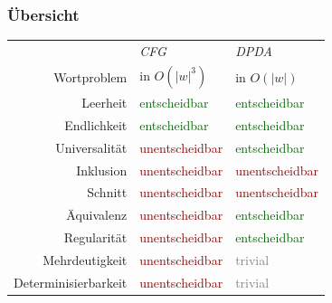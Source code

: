 \documentclass[aspectratio=1610,onlymath]{beamer}
\begin{document}
\begin{frame}\frametitle{Übersicht}

\begin{tabular}{rll}
 & \emph{CFG} & \emph{DPDA}\\
Wortproblem
	& in $O(|w|^3)$
	& in $O(|w|)$\\[1ex]
Leerheit 
	& \textcolor{darkgreen}{entscheidbar}
	& \textcolor{darkgreen}{entscheidbar}\\
Endlichkeit
	& \textcolor{darkgreen}{entscheidbar}
	& \textcolor{darkgreen}{entscheidbar}\\
Universalität
	& \textcolor{darkred}{unentscheidbar}
	& \textcolor{darkgreen}{entscheidbar}\\[1ex]
Inklusion
	& \textcolor{darkred}{unentscheidbar}
	& \textcolor{darkred}{unentscheidbar}\\
Schnitt
	& \textcolor{darkred}{unentscheidbar}
	& \textcolor{darkred}{unentscheidbar}\\
Äquivalenz
	& \textcolor{darkred}{unentscheidbar}
	& \textcolor{darkgreen}{entscheidbar}\\[1ex]
Regularität
	& \textcolor{darkred}{unentscheidbar}
	& \textcolor{darkgreen}{entscheidbar}\\
Mehrdeutigkeit
	& \textcolor{darkred}{unentscheidbar}
	& \textcolor{gray}{trivial}\\
Determinisierbarkeit 
	& \textcolor{darkred}{unentscheidbar}
	& \textcolor{gray}{trivial}\\
\end{tabular}

\end{frame}

\end{document}
